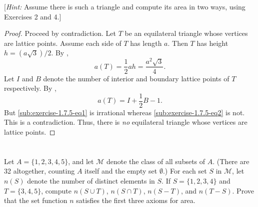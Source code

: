 \documentclass{report}
\begin{document}
[\textit{Hint:} Assume there is such a triangle and compute its area in two
ways, using Exercises 2 and 4.]

\begin{proof}

  Proceed by contradiction.
  Let $T$ be an equilateral triangle whose vertices are lattice points.
  Assume each side of $T$ has length $a$.
  Then $T$ has height $h = (a\sqrt{3}) / 2$.
  By ,
    \begin{equation}
      \label{sub:exercise-1.7.5-eq1}
      \tag{5.1}
      a(T) = \frac{1}{2}ah = \frac{a^2\sqrt{3}}{4}.
    \end{equation}
  Let $I$ and $B$ denote the number of interior and boundary lattice points of
    $T$ respectively.
  By ,
    \begin{equation}
      \label{sub:exercise-1.7.5-eq2}
      \tag{5.2}
      a(T) = I + \frac{1}{2}B - 1.
    \end{equation}
  But \eqref{sub:exercise-1.7.5-eq1} is irrational whereas
    \eqref{sub:exercise-1.7.5-eq2} is not.
  This is a contradiction.
  Thus, there is \textit{no} equilateral triangle whose vertices are lattice
    points.

\end{proof}

\section{}%
\label{sec:exercise-1.7.6}

Let $A = \{1, 2, 3, 4, 5\}$, and let $\mathscr{M}$ denote the class of all
  subsets of $A$.
(There are 32 altogether, counting $A$ itself and the empty set $\emptyset$.)
For each set $S$ in $\mathscr{M}$, let $n(S)$ denote the number of distinct
  elements in $S$.
If $S = \{1, 2, 3, 4\}$ and $T = \{3, 4, 5\}$, compute $n(S \cup T)$,
  $n(S \cap T)$, $n(S - T)$, and $n(T - S)$.
Prove that the set function $n$ satisfies the first three axioms for area.
\end{document}
